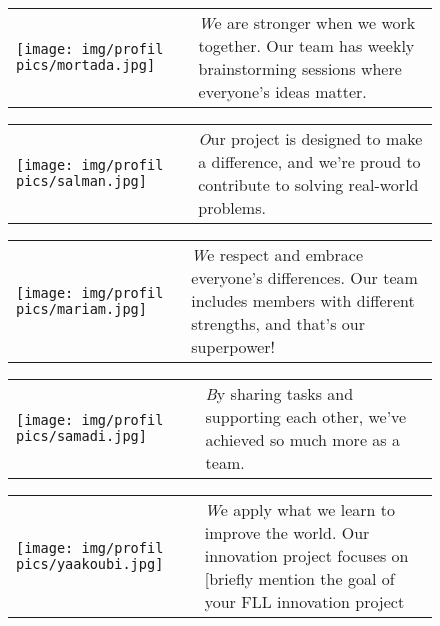 \newpage

\begin{figure}[H]
   
    \begin{tabular}{m{} m{}}
        \texttt{[image: img/profil pics/mortada.jpg]} & 
        \textit We are stronger when we work together. Our team has weekly brainstorming sessions where everyone’s ideas matter.
    \end{tabular}
\end{figure}



\begin{figure}[H]
   
    \begin{tabular}{m{} m{}}
        \texttt{[image: img/profil pics/salman.jpg]} & 
        \textit Our project is designed to make a difference, and we’re proud to contribute to solving real-world problems.
    \end{tabular}
\end{figure}


\begin{figure}[H]
   
    \begin{tabular}{m{} m{}}
        \texttt{[image: img/profil pics/mariam.jpg]} & 
        \textit We respect and embrace everyone’s differences. Our team includes members with different strengths, and that’s our superpower!
    \end{tabular}
\end{figure}



\begin{figure}[H]
   
    \begin{tabular}{m{} m{}}
        \texttt{[image: img/profil pics/samadi.jpg]} & 
        \textit By sharing tasks and supporting each other, we’ve achieved so much more as a team.
    \end{tabular}
\end{figure}

\newpage


\begin{figure}[H]
   
    \begin{tabular}{m{} m{}}
        \texttt{[image: img/profil pics/yaakoubi.jpg]} & 
        \textit We apply what we learn to improve the world. Our innovation project focuses on [briefly mention the goal of your FLL innovation project
    \end{tabular}
\end{figure}




